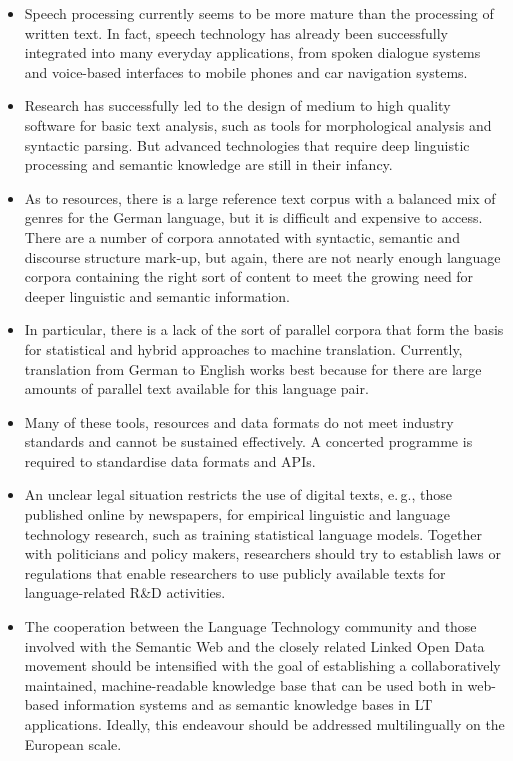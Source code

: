 \documentclass[]{../../metanetpaper}
\begin{document}
\begin{multicols}{2}
\begin{itemize}
\item Speech processing currently seems to be more mature than the processing of written text. In fact, speech technology has already been successfully integrated into many everyday applications, from spoken dialogue systems and voice-based interfaces to mobile phones and car navigation systems. 
\item Research has successfully led to the design of medium to high quality software for basic text analysis, such as tools for morphological analysis and syntactic parsing. But advanced technologies that require deep linguistic processing and semantic knowledge are still in their infancy. 
\item As to resources, there is a large reference text corpus with a balanced mix of genres for the German language, but it is difficult and expensive to access. There are a number of corpora annotated with syntactic, semantic and discourse structure mark-up, but again, there are not nearly enough language corpora containing the right sort of content to meet the growing need for deeper linguistic and semantic information. 
\item In particular, there is a lack of the sort of parallel corpora that form the basis for statistical and hybrid approaches to machine translation. Currently, translation from German to English works best because for there are large amounts of parallel text available for this language pair. 
\item Many of these tools, resources and data formats do not meet industry standards and cannot be sustained effectively. A concerted programme is required to standardise data formats and APIs.
\item An unclear legal situation restricts the use of digital texts, e.\,g., those published online by newspapers, for empirical linguistic and language technology research, such as training statistical language models. Together with politicians and policy makers, researchers should try to establish laws or regulations that enable researchers to use publicly available texts for language-related R\&D activities.
\item The cooperation between the Language Technology community and those involved with the Semantic Web and the closely related Linked Open Data movement should be intensified with the goal of establishing a collaboratively maintained, machine-readable knowledge base that can be used both in web-based information systems and as semantic knowledge bases in LT applications. Ideally, this endeavour should be addressed multilingually on the European scale.
\end{itemize}


\end{multicols}
\end{document}
